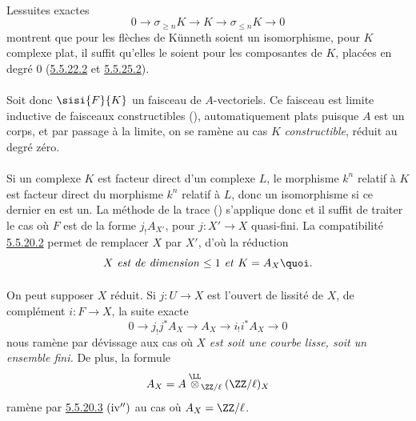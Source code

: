 \paragraph{}
Les\pageoriginale suites exactes
$$
0\longrightarrow \sigma_{\geq n} K\longrightarrow K\longrightarrow
\sigma_{\leq n} K\longrightarrow 0
$$
montrent que pour les flèches de Künneth soient un isomorphisme, pour
$K$ complexe plat, il suffit qu'elles le soient pour les composantes
de $K$, placées en degré $0$ (\hyperref[XVII.lem5.5.22.2]{5.5.22.2}\sisi{)}{} et \sisi{(}{}\hyperref[XVII.par5.5.25.2]{5.5.25.2}).

\paragraph{}
Soit donc $\sisi{F}{K}$ un faisceau de $A$-vectoriels. Ce faisceau est limite
inductive de faisceaux constructibles (), automatiquement
plats puisque $A$ est un corps, et par passage à la limite, on se
ramène au cas $K$ \emph{constructible}, réduit au degré zéro.

\paragraph{}
Si un complexe $K$ est facteur direct d'un complexe $L$, le morphisme
$k^{n}$ relatif à $K$ est facteur direct du morphisme $k^{n}$ relatif
à $L$, donc un isomorphisme si ce dernier en est un. La méthode de la
trace () s'applique donc et il suffit de traiter le cas où $F$
est de la forme $j_{!}A_{X'}$, pour $j:X'\rightarrow X$ quasi-fini. La
compatibilité \hyperref[XVII.par5.5.20.2]{5.5.20.2} permet de remplacer $X$ par $X'$, d'où la
réduction
$$
\mbox{$X$ \emph{est de dimension $\leq 1$ et} $K=A_{X}${\quoi}.}
$$

\paragraph{}
On peut supposer $X$ réduit. Si $j:U\rightarrow X$ est l'ouvert de
lissité de $X$, de complément $i:F\rightarrow X$, la suite exacte
$$
0\longrightarrow j_{!}j^{\ast}A_{X}\longrightarrow
A_{X}\longrightarrow i_{!}i^{\ast}A_{X}\longrightarrow 0
$$
nous ramène par dévissage aux cas où $X$ \emph{est soit une courbe
lisse, soit un ensemble fini.} De plus, la formule
$$
A_{X}=A\overset{\LL}{\otimes}_{\ZZ/\ell}(\ZZ/\ell)_{X}
$$
ramène par \hyperref[XVII.par5.5.20.3]{5.5.20.3} ${\rm(iv'')}$ au cas où $A_{X}=\ZZ/\ell$.

